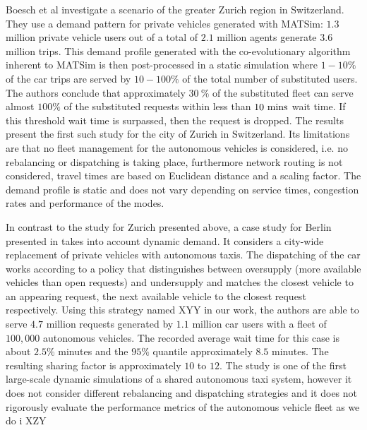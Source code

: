 Boesch et al \cite{boesch2016autonomous} investigate a scenario of the greater Zurich region in Switzerland. They use a demand pattern for private vehicles generated with MATSim: $1.3$ million  private vehicle users out of a total of $2.1$ million agents generate $3.6$ million trips. This demand profile generated with the co-evolutionary algorithm inherent to MATSim is then post-processed in a static simulation where $1-10 \%$ of the car trips are served by $10-100 \%$ of the total number of substituted users. The authors conclude that approximately $30 ~ \%$ of the substituted fleet can serve almost $100 \%$ of the substituted requests within less than $10 ~ \textnormal{mins}$ wait time. If this threshold wait time is surpassed, then the request is dropped. The results present the first such study for the city of Zurich in Switzerland. Its limitations are that no fleet management for the autonomous vehicles is considered, i.e. no rebalancing or dispatching is taking place, furthermore network routing is not considered, travel times are based on Euclidean distance and a scaling factor. The demand profile is static and does not vary depending on service times, congestion rates and performance of the modes.

In contrast to the study for Zurich presented above, a case study for Berlin presented in \cite{bischoff2016simulation} takes into account dynamic demand. It considers a city-wide replacement of private vehicles with autonomous taxis. The dispatching of the car works according to a policy that distinguishes between oversupply (more available vehicles than open requests) and undersupply and matches the closest vehicle to an appearing request, the next available vehicle to the closest request respectively. Using this strategy named XYY in our work, the authors are able to serve $4.7$ million requests generated by $1.1$ million car users with a fleet of $100,000$ autonomous vehicles. The recorded average wait time for this case is about $2.5 \%$ minutes and the $95\%$ quantile approximately $8.5$ minutes. The resulting sharing factor is approximately $10$ to $12$. The study is one of the first large-scale dynamic simulations of a shared autonomous taxi system, however it does not consider different rebalancing and dispatching strategies and it does not rigorously evaluate the performance metrics of the autonomous vehicle fleet as we do i
XZY
